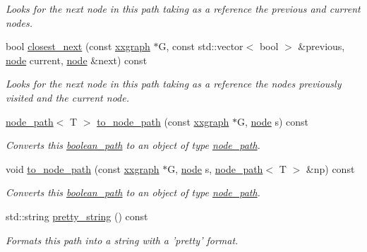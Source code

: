 \begin{DoxyCompactItemize}
\begin{DoxyCompactList}\small\item\em Looks for the next node in this path taking as a reference the {\itshape previous} and {\itshape current} nodes. \end{DoxyCompactList}\item 
bool \hyperlink{classlgraph_1_1boolean__path_a64750d012e8f3037744a26e36804e92b}{closest\-\_\-next} (const \hyperlink{classlgraph_1_1xxgraph}{xxgraph} $\ast$G, const std\-::vector$<$ bool $>$ \&previous, \hyperlink{namespacelgraph_a397169dd66adf725210a30fb7251773e}{node} current, \hyperlink{namespacelgraph_a397169dd66adf725210a30fb7251773e}{node} \&next) const 
\begin{DoxyCompactList}\small\item\em Looks for the next node in this path taking as a reference the nodes previously visited and the {\itshape current} node. \end{DoxyCompactList}\item 
\hyperlink{classlgraph_1_1node__path}{node\-\_\-path}$<$ T $>$ \hyperlink{classlgraph_1_1boolean__path_ac661d8bcabc7aa76b44f13edec88ea73}{to\-\_\-node\-\_\-path} (const \hyperlink{classlgraph_1_1xxgraph}{xxgraph} $\ast$G, \hyperlink{namespacelgraph_a397169dd66adf725210a30fb7251773e}{node} s) const 
\begin{DoxyCompactList}\small\item\em Converts this \hyperlink{classlgraph_1_1boolean__path}{boolean\-\_\-path} to an object of type \hyperlink{classlgraph_1_1node__path}{node\-\_\-path}. \end{DoxyCompactList}\item 
void \hyperlink{classlgraph_1_1boolean__path_a6051571fc3d56c7e535c9d3aa984e7b0}{to\-\_\-node\-\_\-path} (const \hyperlink{classlgraph_1_1xxgraph}{xxgraph} $\ast$G, \hyperlink{namespacelgraph_a397169dd66adf725210a30fb7251773e}{node} s, \hyperlink{classlgraph_1_1node__path}{node\-\_\-path}$<$ T $>$ \&np) const 
\begin{DoxyCompactList}\small\item\em Converts this \hyperlink{classlgraph_1_1boolean__path}{boolean\-\_\-path} to an object of type \hyperlink{classlgraph_1_1node__path}{node\-\_\-path}. \end{DoxyCompactList}\item 
std\-::string \hyperlink{classlgraph_1_1boolean__path_af862f948f259138ed21876d0db7066ce}{pretty\-\_\-string} () const 
\begin{DoxyCompactList}\small\item\em Formats this path into a string with a 'pretty' format. \end{DoxyCompactList}\item 

\end{DoxyCompactItemize}
